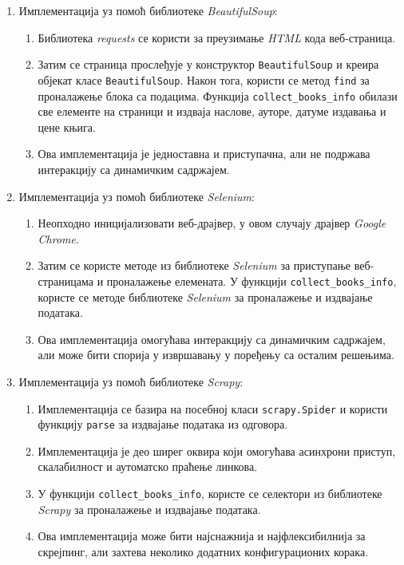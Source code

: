 \documentclass[12pt,oneside]{memoir}
\begin{document}
\begin{enumerate}
\item Имплементација уз помоћ библиотеке \textit{BeautifulSoup}:
\begin{enumerate}
\item Библиотека \textit{requests} се користи за преузимање \textit{HTML} кода веб-страница.
\item Затим се страница прослеђује у конструктор \texttt{BeautifulSoup} и креира објекат класе \texttt{BeautifulSoup}. Након тога, користи се метод \texttt{find} за проналажење блока са подацима. Функција \texttt{collect\_books\_info} обилази све елементе на страници и издваја наслове, ауторе, датуме издавања и цене књига.
\item Ова имплементација је једноставна и приступачна, али не подржава интеракцију са динамичким садржајем.
\end{enumerate}
\item Имплементација уз помоћ библиотеке \textit{Selenium}:
\begin{enumerate}
\item Неопходно иницијализовати веб-драјвер, у овом случају драјвер \textit{Google Chrome}.
\item Затим се користе методе из библиотеке \textit{Selenium} за приступање веб-страницама и проналажење елемената. У функцији \texttt{collect\_books\_info}, користе се методе библиотеке \textit{Selenium} за проналажење и издвајање података.
\item Ова имплементација омогућава интеракцију са динамичким садржајем, али може бити спорија у извршавању у поређењу са осталим решењима.
\end{enumerate}
\item Имплементација уз помоћ библиотеке \textit{Scrapy}:
\begin{enumerate}
\item Имплементација се базира на посебној класи \texttt{scrapy.Spider} и користи функцију \texttt{parse} за издвајање података из одговора. 
\item Имплементација је део ширег оквира који омогућава асинхрони приступ, скалабилност и аутоматско праћење линкова.
\item У функцији \texttt{collect\_books\_info}, користе се селектори из библиотеке \textit{Scrapy} за проналажење и издвајање података.
\item  Ова имплементација може бити најснажнија и најфлексибилнија за скрејпинг, али захтева неколико додатних конфигурационих корака.
\end{enumerate}
\end{enumerate}
\end{document}
